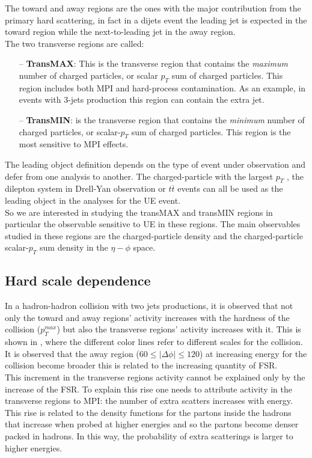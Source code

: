 The toward and away regions are the ones with the major contribution from the primary hard scattering, in fact in a dijets event the leading jet is expected in the toward region while the next-to-leading jet in the away region.  
\\
The two transverse regions are called:
\begin{itemize}
	\item[--] \textbf{TransMAX}: This is the transverse region that contains the \textit{maximum} number of charged particles, or scalar $p_T$ sum of charged particles. This region includes both MPI and hard-process contamination.
As an example, in events with 3-jets production this region can contain the extra jet.	
	\item[--] \textbf{TransMIN}: is the transverse region that contains the \textit{minimum} number of charged particles, or scalar-$p_T$ sum of charged particles. This region is the most  sensitive to MPI effects.
\end{itemize}

\noindent The leading object definition depends on the type of event under observation and defer from one analysis to another. 
The charged-particle with the largest $p_T$ \cite{CMS-PAS-FSQ-15-007}, the dilepton system in Drell-Yan observation \cite{CMS:2012oqb, CMS:2017ngy} or $t\overline{t}$ events \cite{CMS:2018mdd} can all be used as the leading object in the analyses for the UE event.
\\
So we are interested in studying the transMAX and transMIN regions in particular the observable sensitive to UE in these regions. The main observables studied in these regions are the charged-particle density and the charged-particle scalar-$p_T$ sum density in the $\eta-\phi$ space.



\subsection{Hard scale dependence}

In a hadron-hadron collision with two jets productions, it is observed that not only the toward and away regions' activity increases with the hardness of the collision ($p_T^{max}$) but also the transverse regions' activity increases with it. This is shown in , where the different color lines refer to different scales for the collision. It is observed that the away region ($60\leq |\Delta\phi|\leq 120$) at increasing energy for the collision become broader this is related to the increasing quantity of FSR.
\\
This increment in the transverse regions activity cannot be explained only by the increase of the FSR. To explain this rise one needs to attribute activity in the transverse regions to MPI: the number of extra scatters increases with energy. This rise is related to the density functions for the partons inside the hadrons that increase when probed at higher energies and so the partons become denser packed in hadrons. In this way, the  probability of extra scatterings is larger to higher energies. 

